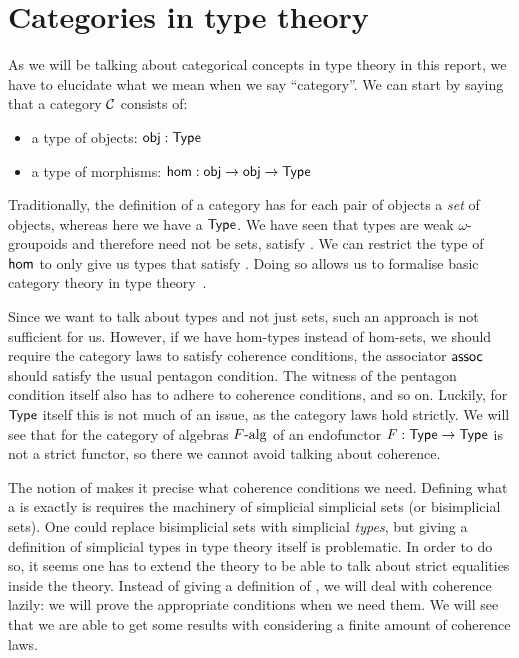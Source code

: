 \documentclass[a4paper,10pt]{report}
\begin{document}
\section{Categories in type theory}
\label{sec:catintt}

As we will be talking about categorical concepts in type theory in
this report, we have to elucidate what we mean when we say \eg
``category''. We can start by saying that a category $\mathcal{C}$ consists of:
%
\begin{itemize}
\item a type of objects: $\mathsf{obj} : \mathsf{Type}$
\item a type of morphisms: $\mathsf{hom} : \mathsf{obj} \to \mathsf{obj} \to \mathsf{Type}$
\end{itemize}
%
Traditionally, the definition of a category has for each pair of
objects a \emph{set} of objects, whereas here we have a $\mathsf{Type}$. We
have seen that types are weak $\omega$-groupoids and therefore need
not be sets, \ie satisfy \uip. We can restrict the type of $\mathsf{hom}$ to
only give us types that satisfy \uip. Doing so allows us to formalise
basic category theory in type theory~\cite{Ahrens2015}.

Since we want to talk about types and not just sets, such an approach
is not sufficient for us. However, if we have hom-types instead of
hom-sets, we should require the category laws to satisfy coherence
conditions, \eg the associator $\mathsf{assoc}$ should satisfy the usual
pentagon condition. The witness of the pentagon condition itself also
has to adhere to coherence conditions, and so on. Luckily, for $\mathsf{Type}$
itself this is not much of an issue, as the category laws hold
strictly. We will see that for the category of algebras $F\mbox{-alg}$
of an endofunctor $F : \mathsf{Type} \to \mathsf{Type}$ is not a strict functor, so
there we cannot avoid talking about coherence.

The notion of \omegacat makes it precise what coherence conditions we
need. Defining what a \omegacat is exactly is requires the machinery
of simplicial simplicial sets (or bisimplicial sets). One could
replace bisimplicial sets with simplicial \emph{types}, but giving a
definition of simplicial types in type theory itself is
problematic. In order to do so, it seems one has to extend the theory
to be able to talk about strict equalities inside the theory. Instead
of giving a definition of \omegacats, we will deal with coherence
lazily: we will prove the appropriate conditions when we need them. We
will see that we are able to get some results with considering a
finite amount of coherence laws.
\end{document}

